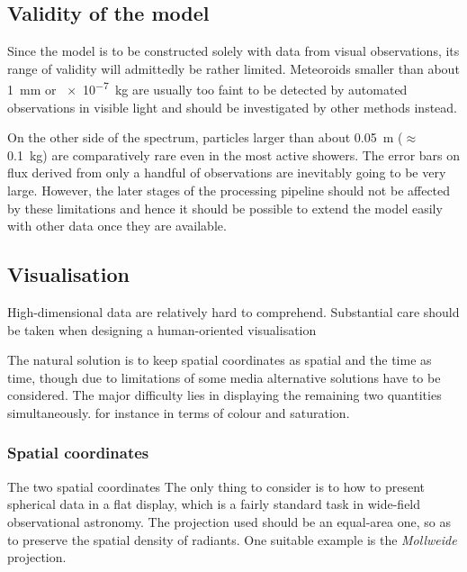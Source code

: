     \subsection{Validity of the model} \label{iav}
        Since the model is to be constructed solely with data from visual observations,
        its range of validity will admittedly be rather limited.
        Meteoroids smaller than about \SI{1}{\milli\metre} or \SI{e-7}{\kilo\gram} are usually too faint
        to be detected by automated observations in visible light and should be investigated
        by other methods instead.

        On the other side of the spectrum, particles larger than about \SI{0.05}{\metre} ($\approx$ \SI{0.1}{\kilo\gram})
        are comparatively rare even in the most active showers.
        The error bars on flux derived from only a handful of observations are inevitably going to be very large.
        However, the later stages of the processing pipeline should not be affected by these limitations
        and hence it should be possible to extend the model easily with other data once they are available.

    \subsection{Visualisation} \label{iov}
        High-dimensional data are relatively hard to comprehend. Substantial care should be taken when designing
        a human-oriented visualisation


        The natural solution is to keep spatial coordinates as spatial and the time as time,
        though due to limitations of some media alternative solutions have to be considered.
        The major difficulty lies in displaying the remaining two quantities simultaneously.
        for instance in terms of colour and saturation.

        \subsubsection{Spatial coordinates} \label{iovs}
            The two spatial coordinates 
            The only thing to consider is to how to present spherical data in a flat display,
            which is a fairly standard task in wide-field observational astronomy.
            The projection used should be an equal-area one, so as to preserve the spatial density of radiants.
            One suitable example is the \emph{Mollweide} projection.

